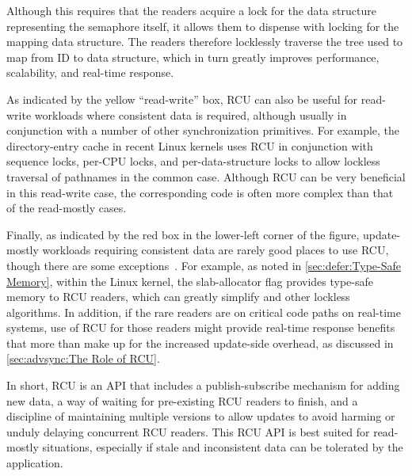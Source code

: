 Although this requires that the readers acquire a lock for the
data structure representing the semaphore itself,
it allows them to dispense with locking for the
mapping data structure.
The readers therefore locklessly
traverse the tree used to map from ID to data structure,
which in turn greatly improves performance, scalability, and
real-time response.

As indicated by the yellow ``read-write'' box, RCU can also be useful
for read-write
workloads where consistent data is required, although usually in
conjunction with a number of other synchronization primitives.
For example, the directory-entry cache in recent Linux kernels uses RCU in
conjunction with sequence locks, per-CPU locks, and per-data-structure
locks to allow lockless traversal of pathnames in the common case.
Although RCU can be very beneficial in this read-write case, the
corresponding code is often more complex than that of the read-mostly
cases.

Finally, as indicated by the red box in the lower-left corner
of the figure, update-mostly workloads requiring consistent
data are rarely good places to use RCU, though there are some
exceptions~\cite{MathieuDesnoyers2012URCU}.
For example, as noted in
\cref{sec:defer:Type-Safe Memory},
within the Linux kernel, the 
slab-allocator flag provides type-safe memory to RCU readers, which can
greatly simplify  and other lockless
algorithms.
In addition, if the rare readers are on critical code paths on real-time
systems, use of RCU for those readers might provide real-time response
benefits that more than make up for the increased update-side overhead,
as discussed in \cref{sec:advsync:The Role of RCU}.

In short, RCU is an API that includes a publish-subscribe mechanism for
adding new data, a way of waiting for pre-existing RCU readers to finish,
and a discipline of maintaining multiple versions to allow updates to
avoid harming or unduly delaying concurrent RCU readers.
This RCU API is best suited for read-mostly situations, especially if
stale and inconsistent data can be tolerated by the application.
